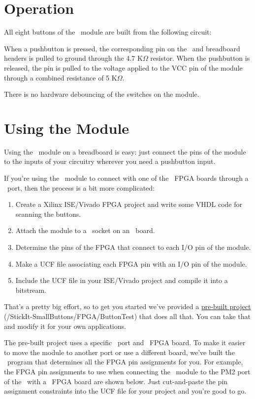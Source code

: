 \documentclass[letterpaper,11pt,oneside]{memoir}
\newcommand{\productrepo}{\github /StickIt-SmallButtons}
\begin{document}
\chapter{Operation}

All eight buttons of the \product\ module are built from the following circuit:


When a pushbutton is pressed, the corresponding pin on the \digpmod\ and breadboard
headers is pulled to ground through the 4.7 K$\Omega$ resistor.
When the pushbutton is released, the pin is pulled to the voltage applied to the
VCC pin of the module through a combined resistance of 5 K$\Omega$.

There is no hardware debouncing of the switches on the module.


\chapter{Using the Module}

Using the \product\ module on a breadboard is easy: just connect the pins of the
module to the inputs of your circuitry wherever you need a pushbutton input.

If you're using the \product\ module to connect with one of the \xess\ FPGA boards
through a \digpmod\ port, then the process is a bit more complicated:

\begin{enumerate}
\item Create a Xilinx ISE/Vivado FPGA project and write some VHDL code for scanning the buttons.
\item Attach the module to a \digpmod\ socket on an \xess\ board.
\item Determine the pins of the FPGA that connect to each I/O pin of the module.
\item Make a UCF file associating each FPGA pin with an I/O pin of the module.
\item Include the UCF file in your ISE/Vivado project and compile it into a bitstream.
\end{enumerate}

That's a pretty big effort, so to get you started we've provided a 
\href{\productrepo /FPGA/ButtonTest}{pre-built project} (\productrepo /FPGA/ButtonTest) 
that does all that.
You can take that and modify it for your own applications.

The pre-built project uses a specific \digpmod\ port and \xess\ FPGA board.
To make it easier to move the module to another port or use a different board, 
we've built the \ program that determines all the FPGA pin
assignments for you.
For example, the FPGA pin assignments to use when connecting the \product\
module to the PM2 port of the \stickit\ with a \xulatwo\ FPGA board are shown below.
Just cut-and-paste the pin assignment constraints into the UCF file for your
project and you're good to go.
\end{document}
